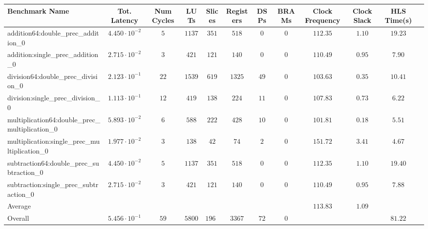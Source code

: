 \begin{tabular}{|l|c|c|c|c|c|c|c|c|c|c|c|}
\hline
Benchmark Name                                   & Tot. Latency            & Num Cycles & LUTs     & Slices   & Registers & DSPs   & BRAMs & Clock Frequency & Clock Slack & HLS Time(s) \\
\hline
addition64:double\_prec\_addition\_0             & $ 4.450 \cdot 10^{-2} $ & $ 5      $ & $ 1137 $ & $ 351  $ & $ 518   $ & $ 0  $ & $ 0 $ & $ 112.35      $ & $ 1.10    $ & $ 19.23   $ \\
addition:single\_prec\_addition\_0               & $ 2.715 \cdot 10^{-2} $ & $ 3      $ & $ 421  $ & $ 121  $ & $ 140   $ & $ 0  $ & $ 0 $ & $ 110.49      $ & $ 0.95    $ & $ 7.90    $ \\
division64:double\_prec\_division\_0             & $ 2.123 \cdot 10^{-1} $ & $ 22     $ & $ 1539 $ & $ 619  $ & $ 1325  $ & $ 49 $ & $ 0 $ & $ 103.63      $ & $ 0.35    $ & $ 10.41   $ \\
division:single\_prec\_division\_0               & $ 1.113 \cdot 10^{-1} $ & $ 12     $ & $ 419  $ & $ 138  $ & $ 224   $ & $ 11 $ & $ 0 $ & $ 107.83      $ & $ 0.73    $ & $ 6.22    $ \\
multiplication64:double\_prec\_multiplication\_0 & $ 5.893 \cdot 10^{-2} $ & $ 6      $ & $ 588  $ & $ 222  $ & $ 428   $ & $ 10 $ & $ 0 $ & $ 101.81      $ & $ 0.18    $ & $ 5.51    $ \\
multiplication:single\_prec\_multiplication\_0   & $ 1.977 \cdot 10^{-2} $ & $ 3      $ & $ 138  $ & $ 42   $ & $ 74    $ & $ 2  $ & $ 0 $ & $ 151.72      $ & $ 3.41    $ & $ 4.67    $ \\
subtraction64:double\_prec\_subtraction\_0       & $ 4.450 \cdot 10^{-2} $ & $ 5      $ & $ 1137 $ & $ 351  $ & $ 518   $ & $ 0  $ & $ 0 $ & $ 112.35      $ & $ 1.10    $ & $ 19.40   $ \\
subtraction:single\_prec\_subtraction\_0         & $ 2.715 \cdot 10^{-2} $ & $ 3      $ & $ 421  $ & $ 121  $ & $ 140   $ & $ 0  $ & $ 0 $ & $ 110.49      $ & $ 0.95    $ & $ 7.88    $ \\
\hline
Average                                          & $                     $ & $        $ & $      $ & $      $ & $       $ & $    $ & $   $ & $ 113.83      $ & $ 1.09    $ & $         $ \\
\hline
Overall                                          & $ 5.456 \cdot 10^{-1} $ & $ 59     $ & $ 5800 $ & $ 1965 $ & $ 3367  $ & $ 72 $ & $ 0 $ & $             $ & $         $ & $ 81.22   $ \\
\hline
\end{tabular}

